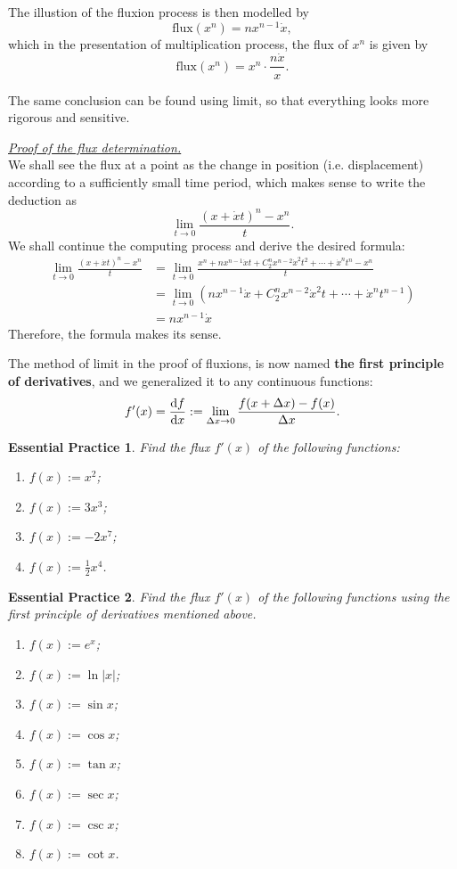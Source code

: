 \documentclass[12pt]{article}
\newtheorem{exercise}{Essential Practice}[section]
\renewenvironment{proof}[1][Proof]{\begin{snugshade*} \underline{\textit{{#1}.}}\\}{\hfill \qedsymbol \end{snugshade*}}
\begin{document}
    The illustion of the fluxion process is then modelled by \[\mathrm{flux}(x^n)=nx^{n-1}\dot{x},\] which in the presentation of multiplication process, the flux of $x^n$ is given by \[\mathrm{flux}(x^n)=x^n\cdot\frac{n\dot{x}}{x}.\]

    The same conclusion can be found using limit, so that everything looks more rigorous and sensitive.

    \begin{proof}[Proof of the flux determination]
        We shall see the flux at a point as the change in position (i.e. displacement) according to a sufficiently small time period, which makes sense to write the deduction as \[\lim_{t\to 0}\frac{(x+\dot{x}t)^n-x^n}{t}.\]
        We shall continue the computing process and derive the desired formula:\begin{align*}
            \lim_{t\to 0}\frac{(x+\dot{x}t)^n-x^n}{t}&=\lim_{t\to 0}\frac{x^n+nx^{n-1}\dot{x}t+C_2^n x^{n-2}\dot{x}^2 t^2 + \cdots + \dot{x}^n t^n - x^n}{t}\\
            &=\lim_{t\to 0} (nx^{n-1}\dot{x}+C_2^n x^{n-2}\dot{x}^2 t + \cdots +\dot{x}^n t^{n-1})\\
            &=nx^{n-1}\dot{x}
        \end{align*}
        Therefore, the formula makes its sense.
    \end{proof}

    The method of limit in the proof of fluxions, is now named \textbf{the first principle of derivatives}, and we generalized it to any continuous functions: \[f'(x)=\derivative{f}{x}(x):=\lim_{\Delta x\to 0}\frac{f(x+\Delta x)-f(x)}{\Delta x}.\]

    \begin{exercise}
        Find the flux $f'(x)$ of the following functions:\begin{enumerate}
            \item $f(x):=x^2$;
            \item $f(x):=3x^3$;
            \item $f(x):=-2x^7$;
            \item $f(x):=\frac{1}{2}x^4$.
        \end{enumerate}
    \end{exercise}

    \begin{exercise}
        Find the flux $f'(x)$ of the following functions using the first principle of derivatives mentioned above.
        \begin{enumerate}
            \item $f(x):=e^x$;
            \item $f(x):=\ln{|x|}$;
            \item $f(x):=\sin{x}$;
            \item $f(x):=\cos{x}$;
            \item $f(x):=\tan{x}$;
            \item $f(x):=\sec{x}$;
            \item $f(x):=\csc{x}$;
            \item $f(x):=\cot{x}$.
        \end{enumerate}
    \end{exercise}
\end{document}

